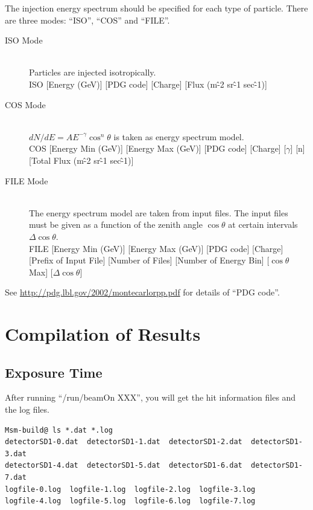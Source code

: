 \documentclass[11pt,a4paper]{jsarticle}
\begin{document}
The injection energy spectrum should be specified for each type of particle.
There are three modes: ``ISO'', ``COS'' and ``FILE''.

\begin{description}
\item[ISO Mode]\mbox{}\\
Particles are injected isotropically.\\
ISO [Energy (GeV)] [PDG code] [Charge] [Flux (m\^-2 sr\^-1 sec\^-1)]
\item[COS Mode]\mbox{}\\
$dN/dE = A E^{-\gamma} \cos^n\theta$ is taken as energy spectrum model.\\
COS [Energy Min (GeV)] [Energy Max (GeV)] [PDG code] [Charge] [$\gamma$] [n] [Total Flux (m\^-2 sr\^-1 sec\^-1)]
\item[FILE Mode]\mbox{}\\
The energy spectrum model are taken from input files. The input files must be given
as a function of the zenith angle $\cos\theta$ at certain intervals $\Delta\cos\theta$. \\
FILE [Energy Min (GeV)] [Energy Max (GeV)] [PDG code] [Charge] [Prefix of Input File] [Number of Files] [Number of Energy Bin] [$\cos\theta$ Max] [$\Delta\cos\theta$]
\end{description}

See \url{http://pdg.lbl.gov/2002/montecarlorpp.pdf} for details of ``PDG code''.



\section{Compilation of Results}
\subsection{Exposure Time}
After running ``/run/beamOn XXX'', you will get the hit information files and the log files.
\begin{screen}
{\small
\begin{verbatim}
Msm-build@ ls *.dat *.log
detectorSD1-0.dat  detectorSD1-1.dat  detectorSD1-2.dat  detectorSD1-3.dat
detectorSD1-4.dat  detectorSD1-5.dat  detectorSD1-6.dat  detectorSD1-7.dat
logfile-0.log  logfile-1.log  logfile-2.log  logfile-3.log
logfile-4.log  logfile-5.log  logfile-6.log  logfile-7.log
\end{verbatim}}
\end{screen}
\end{document}
